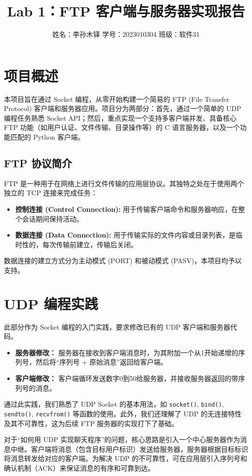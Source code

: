 \documentclass[a4paper,10pt]{article} %
\title{\textbf{Lab 1：FTP 客户端与服务器实现报告}}
\author{姓名：李孙木铎 \quad 学号：2023010304 \quad 班级：软件31}
\begin{document}
\maketitle

\section{项目概述}
本项目旨在通过 Socket 编程，从零开始构建一个简易的 FTP (File Transfer Protocol) 客户端和服务器应用。项目分为两部分：首先，通过一个简单的 UDP 编程任务熟悉 Socket API；然后，重点实现一个支持多客户端并发、具备核心 FTP 功能（如用户认证、文件传输、目录操作等）的 C 语言服务器，以及一个功能匹配的 Python 客户端。

\subsection{FTP 协议简介}
FTP 是一种用于在网络上进行文件传输的应用层协议。其独特之处在于使用两个独立的 TCP 连接来完成任务：
\begin{itemize}
    \item \textbf{控制连接 (Control Connection):} 用于传输客户端命令和服务器响应，在整个会话期间保持活动。
    \item \textbf{数据连接 (Data Connection):} 用于传输实际的文件内容或目录列表，是临时性的，每次传输前建立，传输后关闭。
\end{itemize}
数据连接的建立方式分为主动模式 (PORT) 和被动模式 (PASV)，本项目均予以支持。

\section{UDP 编程实践}
此部分作为 Socket 编程的入门实践，要求修改已有的 UDP 客户端和服务器代码。
\begin{itemize}
    \item \textbf{服务器修改：} 服务器在接收到客户端消息时，为其附加一个从1开始递增的序列号，然后将“序列号 + 原始消息”返回给客户端。
    \item \textbf{客户端修改：} 客户端循环发送数字0到50给服务器，并接收服务器返回的带序列号的消息。
\end{itemize}

通过此实践，我们熟悉了 UDP Socket 的基本用法，如 \verb|socket()|, \verb|bind()|, \verb|sendto()|, \verb|recvfrom()| 等函数的使用。此外，我们还理解了 UDP 的无连接特性及其不可靠性，这为后续 FTP 服务器的实现打下了基础。

对于“如何用 UDP 实现聊天程序”的问题，核心思路是引入一个中心服务器作为消息中继。客户端将消息（包含目标用户标识）发送给服务器，服务器根据目标标识将消息转发给对应的客户端。为解决 UDP 的不可靠性，可在应用层引入序列号和确认机制（ACK）来保证消息的有序和可靠到达。
\end{document}
